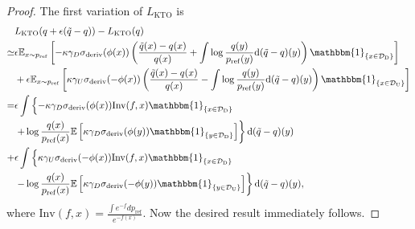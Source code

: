 \begin{proof}
    The first variation of $L_\mathrm{KTO}$ is
    \begin{align}
        &L_\mathrm{KTO}(q+\epsilon(\tilde{q}-q))-L_\mathrm{KTO}(q)\\
        \simeq&\epsilon
        \E_{x\sim \pref}
        \left[-
            \kappa \gamma_D \sigma_\mathrm{deriv}(\phi(x))
            \left(\frac{\tilde{q}(x)-q(x)}{q(x)}
        + \int \log \frac{q(y)}{\pref(y)} \mathrm{d}(\tilde{q}-q)(y)\right)
        \mathbbm{1}_{\lbrace x \in \mathcal{D}_\mathrm{D}\rbrace}
        \right]\\
    &+ \epsilon       
    \E_{x\sim \pref}
        \left[
            \kappa \gamma_U \sigma_\mathrm{deriv}(-\phi(x))
            \left(\frac{\tilde{q}(x)-q(x)}{q(x)}
        - \int \log \frac{q(y)}{\pref(y)} \mathrm{d}(\tilde{q}-q)(y)\right)
        \mathbbm{1}_{\lbrace x \in \mathcal{D}_\mathrm{U}\rbrace}
        \right]\\
    =&\epsilon
      \int
        \left\lbrace-
            \kappa \gamma_D \sigma_\mathrm{deriv}(\phi(x))
            \mathrm{Inv}(f,x)\mathbbm{1}_{\lbrace x \in \mathcal{D}_\mathrm{D}\rbrace}\right.\\
        &\left.+ \log \frac{q(x)}{\pref(x)}
        \E\left[
        \kappa \gamma_D \sigma_\mathrm{deriv}(\phi(y))
        \mathbbm{1}_{\lbrace y \in \mathcal{D}_\mathrm{D}\rbrace}
        \right]
        \right\rbrace
        \mathrm{d}(\tilde{q}-q)(y)
        \\
    +&        
    \epsilon
      \int
        \left\lbrace
            \kappa \gamma_U \sigma_\mathrm{deriv}(-\phi(x))
            \mathrm{Inv}(f,x)\mathbbm{1}_{\lbrace x \in \mathcal{D}_\mathrm{D}\rbrace}\right.\\
            &\left.- \log \frac{q(x)}{\pref(x)}
            \E\left[
            \kappa \gamma_D \sigma_\mathrm{deriv}(-\phi(y))
            \mathbbm{1}_{\lbrace y \in \mathcal{D}_\mathrm{U}\rbrace}
            \right]
        \right\rbrace
        \mathrm{d}(\tilde{q}-q)(y),
    \end{align}
    where $\mathrm{Inv}(f,x) = \frac{\int e^{-f} dp_\mathrm{ref}}{e^{-f(x)}}$.
    Now the desired result immediately follows.
\end{proof}
